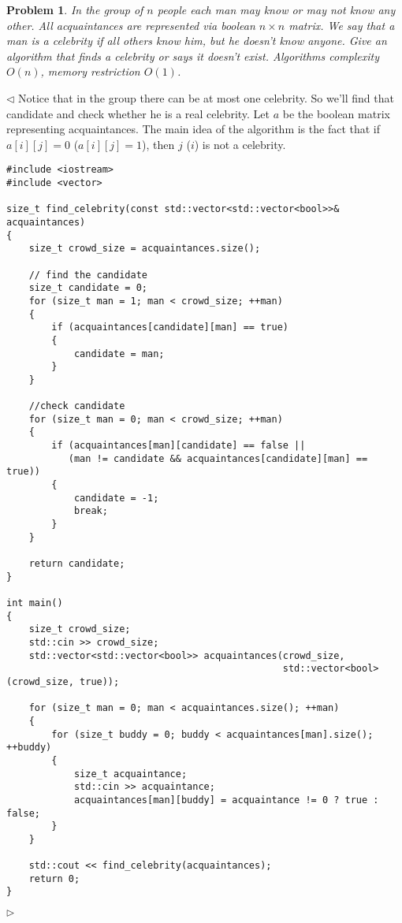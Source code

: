 \documentclass[12pt]{article}
\newtheorem{problem}{Problem}[subsection]
\newenvironment{solution}{\par $\triangleleft$}{$\triangleright$}
\begin{document}
\begin{problem} In the group of $n$ people each man may know or may not know any other. All acquaintances are represented via boolean $n\times n$ matrix. We say that a man is a celebrity if all others know him, but he doesn't know anyone. Give an algorithm that finds a celebrity or says it doesn't exist. Algorithms complexity $O(n)$, memory restriction $O(1)$.
\end{problem}
\begin{solution} Notice that in the group there can be at most one celebrity. So we'll find that candidate and check whether he is a real celebrity. Let $a$ be the boolean matrix representing acquaintances. The main idea of the algorithm is the fact that if $a[i][j]=0$ ($a[i][j]=1$), then $j$ ($i$) is not a celebrity.
\begin{verbatim}
#include <iostream>
#include <vector>
 
size_t find_celebrity(const std::vector<std::vector<bool>>& acquaintances)
{
    size_t crowd_size = acquaintances.size();
 
    // find the candidate 
    size_t candidate = 0;
    for (size_t man = 1; man < crowd_size; ++man)
    {
        if (acquaintances[candidate][man] == true)
        {
            candidate = man;
        }
    }
 
    //check candidate
    for (size_t man = 0; man < crowd_size; ++man)
    {
        if (acquaintances[man][candidate] == false || 
           (man != candidate && acquaintances[candidate][man] == true))
        {
            candidate = -1;
            break;
        }
    }
 
    return candidate;
}
 
int main()
{
    size_t crowd_size;
    std::cin >> crowd_size;
    std::vector<std::vector<bool>> acquaintances(crowd_size, 
                                                 std::vector<bool>(crowd_size, true));
 
    for (size_t man = 0; man < acquaintances.size(); ++man)
    {
        for (size_t buddy = 0; buddy < acquaintances[man].size(); ++buddy)
        {
            size_t acquaintance;
            std::cin >> acquaintance;
            acquaintances[man][buddy] = acquaintance != 0 ? true : false;
        }
    }
 
    std::cout << find_celebrity(acquaintances);
    return 0;
}
\end{verbatim}
\end{solution}
 
\end{document}

